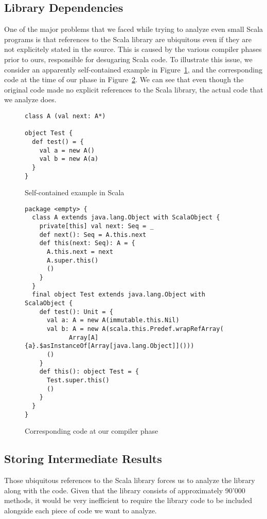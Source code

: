 \subsection{Library Dependencies}
One of the major problems that we faced while trying to analyze even small
Scala programs is that references to the Scala library are ubiquitous even if
they are not explicitely stated in the source. This is caused by the various
compiler phases prior to ours, responsible for desugaring Scala code. To
illustrate this issue, we consider an apparently self-contained example in
Figure~\ref{fig:imp:class}, and the corresponding code at the time of our phase
in Figure~\ref{fig:imp:classlater}. We can see that even though the original
code made no explicit references to the Scala library, the actual code that we
analyze does.
\begin{figure}[h]
    \centering
\begin{lstlisting}
class A (val next: A*)

object Test {
  def test() = {
    val a = new A()
    val b = new A(a)
  }
}
\end{lstlisting}
    \caption{Self-contained example in Scala}
    \label{fig:imp:class}
\end{figure}

\begin{figure}[h]
    \centering
\begin{lstlisting}
package <empty> {
  class A extends java.lang.Object with ScalaObject {
    private[this] val next: Seq = _
    def next(): Seq = A.this.next
    def this(next: Seq): A = {
      A.this.next = next
      A.super.this()
      ()
    }
  }
  final object Test extends java.lang.Object with ScalaObject {
    def test(): Unit = {
      val a: A = new A(immutable.this.Nil)
      val b: A = new A(scala.this.Predef.wrapRefArray(
            Array[A]{a}.$asInstanceOf[Array[java.lang.Object]]()))
      ()
    }
    def this(): object Test = {
      Test.super.this()
      ()
    }
  }
}
\end{lstlisting}
    \caption{Corresponding code at our compiler phase}
    \label{fig:imp:classlater}
\end{figure}

\subsection{Storing Intermediate Results}
Those ubiquitous references to the Scala library forces us to analyze the
library along with the code. Given that the library consists of approximately
90'000 methods, it would be very inefficient to require the library code to be
included alongside each piece of code we want to analyze.

